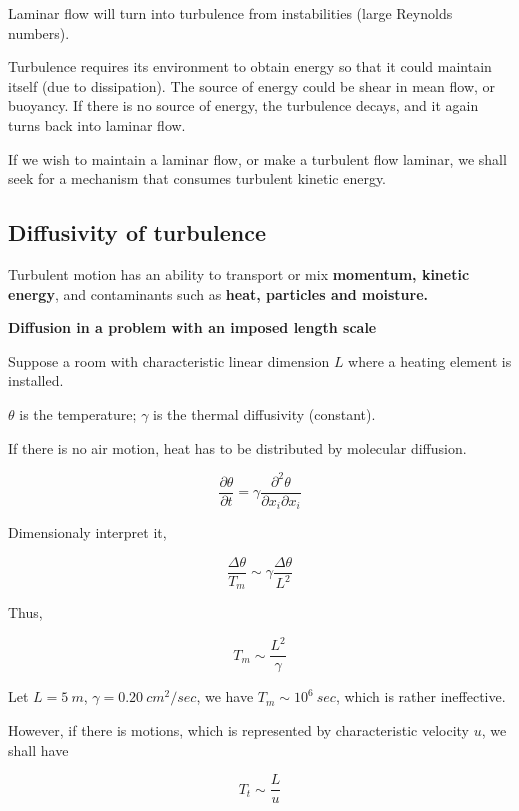 \documentclass{article}
\begin{document}
Laminar flow will turn into turbulence from instabilities (large Reynolds numbers).

Turbulence requires its environment to obtain energy so that it could maintain itself (due to dissipation). The source of energy could be shear in mean flow, or buoyancy.
If there is no source of energy, the turbulence decays, and it again turns back into laminar flow.

If we wish to maintain a laminar flow, or make a turbulent flow laminar, we shall seek for a mechanism that consumes turbulent kinetic energy.

\subsection{Diffusivity of turbulence}

Turbulent motion has an ability to transport or mix \textbf{momentum, kinetic energy}, and contaminants such as \textbf{heat, particles and moisture.}

\textbf{Diffusion in a problem with an imposed length scale}

Suppose a room with characteristic linear dimension $L$ where a heating element is installed.

$\theta$ is the temperature; $\gamma$ is the thermal diffusivity (constant).

If there is no air motion, heat has to be distributed by molecular diffusion.

\begin{equation*}
    \frac{\partial \theta}{\partial t}=\gamma\frac{\partial^2\theta}{\partial x_i \partial x_i}
\end{equation*}

Dimensionaly interpret it,

\begin{equation*}
    \frac{\Delta \theta}{T_m}\sim\gamma\frac{\Delta\theta}{L^2}
\end{equation*}

Thus,

\begin{equation*}
    T_m\sim\frac{L^2}{\gamma}
\end{equation*}

Let $L=5\ m$, $\gamma=0.20\ cm^2/sec$, we have $T_m\sim 10^6\ sec$, which is rather ineffective.

However, if there is motions, which is represented by characteristic velocity $u$, we shall have

\begin{equation*}
    T_t\sim\frac{L}{u}
\end{equation*}
\end{document}
